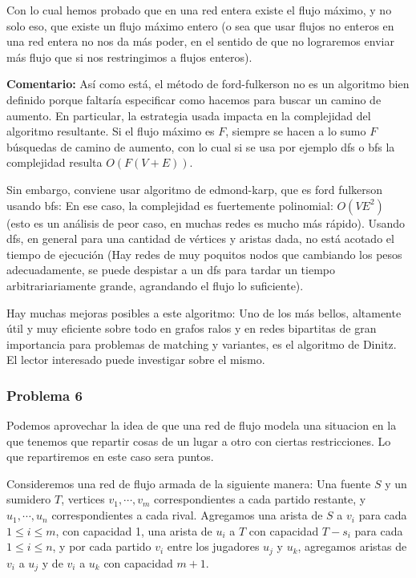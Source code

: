 \documentclass{article}
\begin{document}
Con lo cual hemos probado que en una red entera existe el flujo máximo, y no solo eso, que existe un flujo máximo entero (o sea que usar
flujos no enteros en una red entera no nos da más poder, en el sentido de que no lograremos enviar más flujo que si nos restringimos a
flujos enteros).

\textbf{Comentario:} Así como está, el método de ford-fulkerson no es un algoritmo bien definido porque faltaría especificar como hacemos
para buscar un camino de aumento. En particular, la estrategia usada impacta en la complejidad del algoritmo resultante. Si el flujo
máximo es $F$, siempre se hacen a lo sumo $F$ búsquedas de camino de aumento, con lo cual si se usa por ejemplo dfs o bfs la complejidad
resulta $O(F(V+E))$. 

Sin embargo, conviene usar algoritmo de edmond-karp, que es ford fulkerson usando bfs: En ese caso, la complejidad
es fuertemente polinomial: $O(VE^2)$ (esto es un análisis de peor caso, en muchas redes es mucho más rápido).
Usando dfs, en general para una cantidad de vértices y aristas dada, no está acotado el tiempo de
ejecución (Hay redes de muy poquitos nodos que cambiando los pesos adecuadamente, se puede despistar a un dfs para tardar un tiempo
arbitrariariamente grande, agrandando el flujo lo suficiente).

Hay muchas mejoras posibles a este algoritmo: Uno de los más bellos, altamente útil y muy eficiente sobre todo en grafos ralos y en redes
bipartitas de gran importancia para problemas de matching y variantes, es el algoritmo de Dinitz. El lector interesado puede investigar sobre el mismo.

\subsubsection{Problema 6}

Podemos aprovechar la idea de que una red de flujo modela una situacion en la que tenemos que repartir cosas de un lugar a otro con
ciertas restricciones. Lo que repartiremos en este caso sera puntos.

Consideremos una red de flujo armada de la siguiente manera: Una fuente $S$ y un sumidero $T$, vertices $v_1, \cdots, v_m$ correspondientes
a cada partido restante, y $u_1, \cdots, u_n$ correspondientes a cada rival. Agregamos una arista de $S$ a $v_i$ para cada $1 \leq i \leq m$, con capacidad
1, una arista de $u_i$ a $T$ con capacidad $T - s_i$ para cada $1 \leq i \leq n$, y por cada partido $v_i$ entre los jugadores $u_j$ y $u_k$,
agregamos aristas de $v_i$ a $u_j$ y de $v_i$ a $u_k$ con capacidad $m + 1$.
\end{document}
